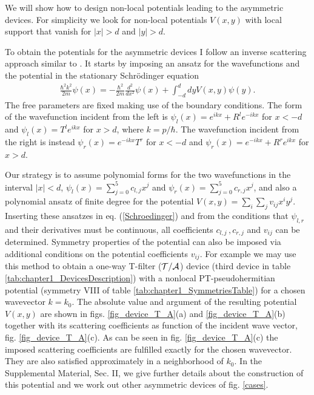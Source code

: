 We will show  how to design non-local potentials
leading to the asymmetric devices.
For simplicity we look for  non-local potentials $V(x,y)$ with local support
that vanish  for $|x| >d$ and $|y| >d$.

To obtain the potentials for the asymmetric devices I follow an inverse scattering approach similar to \cite{Palao1998}. It starts by imposing an ansatz for the wavefunctions and the potential in the stationary Schr\"{o}dinger equation
%
\begin{eqnarray}
  \frac{\hbar^2k^2}{2m} \psi (x) = - \frac{\hbar^2}{2m} \frac{d^2}{dx^2} \psi (x)
  +\!\!\int_{-d}^d \!dy V(x, y) \psi(y).
  \label{Schroedinger}
\end{eqnarray}
%
The free parameters are fixed making use of the boundary conditions.
The form of the wavefunction incident from the left is
$\psi_l(x) = e^{i k x} + R^l e^{-i k x}$ for $x < -d$ and $\psi_l (x) = T^l e^{i k x}$ for $x > d$,
where  $k=p/\hbar$.
The wavefunction incident from the right is instead
$\psi_r(x) = e^{-ikx} T^r$ for $x < -d$ and $\psi_r (x) = e^{-i k x} + R^r e^{i k x}$ for $x > d$.

Our strategy is to assume  polynomial forms for the two wavefunctions in the interval $|x| < d$,
$\psi_l (x) = \sum_{j=0}^5 c_{l,j} x^j$ and $\psi_r (x) = \sum_{j=0}^5 c_{r,j} x^j$, and also a
polynomial ansatz of finite degree for the potential $V(x,y) = \sum_i \sum_j v_{ij} x^i y^j$.
Inserting these ansatzes in eq. (\ref{Schroedinger}) and from the conditions that $\psi_{l,r}$
and their derivatives must be continuous, all coefficients $c_{l,j}\,,c_{r,j}$ and $v_{ij}$ can be determined.
Symmetry properties of the potential can also be imposed via additional conditions on
the potential coefficients $v_{ij}$. For example we may use this method to obtain a one-way T-filter ($\cal{T/A}$) device (third device in table \ref{tab:chapter1_DevicesDescription}) with a nonlocal PT-pseudohermitian potential (symmetry VIII of table \ref{tab:chapter1_SymmetriesTable}) for a chosen wavevector $k = k_0$. The absolute value and argument of the resulting potential $V(x,y)$ are shown in figs. \ref{fig_device_T_A}(a) and \ref{fig_device_T_A}(b) together with its scattering coefficients as function of the incident wave vector, fig. \ref{fig_device_T_A}(c). As can be seen in fig. \ref{fig_device_T_A}(c) the imposed scattering coefficients are fulfilled exactly for the chosen wavevector. They are also satisfied approximately in a neighborhood of $k_0$. In the  Supplemental Material, Sec. II, we give further details about the construction of this potential and we work out other asymmetric devices of fig. \ref{cases}.
%
%
%
%
%

